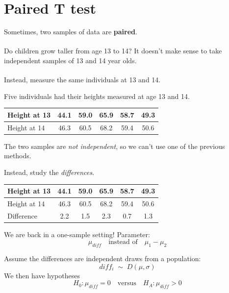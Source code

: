 \documentclass[xcolor={dvipsnames,svgnames},14pt]{beamer}
\begin{document}
\section{Paired T test}

\begin{frame}
Sometimes, two samples of data are \textbf{paired}. \\~\\

Do children grow taller from age 13 to 14?  It doesn't make sense to take independent samples of 13 and 14 year olds. \\~\\

Instead, measure the same individuals at 13 and 14.
\end{frame}

\begin{frame}
Five individuals had their heights measured at age 13 and 14.
\begin{center}
\begin{tabular}{|l||c|c|c|c|c|}
\hline
Height at 13 & 44.1 & 59.0 & 65.9 & 58.7 & 49.3 \\
\hline
Height at 14 & 46.3 & 60.5 & 68.2 & 59.4 & 50.6 \\
\hline
\end{tabular}
\end{center}
\vspace{5pt}
The two samples are \textit{not independent}, so we can't use one of the previous methods.
\end{frame}

\begin{frame}
Instead, study the \textit{differences}.
\begin{center}
\begin{tabular}{|l||c|c|c|c|c|}
\hline
Height at 13 & 44.1 & 59.0 & 65.9 & 58.7 & 49.3 \\
\hline
Height at 14 & 46.3 & 60.5 & 68.2 & 59.4 & 50.6 \\
\hline
\hline
Difference & 2.2 & 1.5 & 2.3 & 0.7 & 1.3 \\
\hline
\end{tabular}
\end{center}
\vspace{5pt}
We are back in a one-sample setting!  Parameter:
$$\mu_{diff} \quad \text{instead of}\quad \mu_1 - \mu_2$$
\end{frame}

\begin{frame}
Assume the differences are independent draws from a population:
$$diff_i \;\sim\; D(\mu, \sigma)$$
We then have hypotheses
$$H_0: \mu_{diff} = 0 \quad \text{versus} \quad H_A: \mu_{diff} > 0$$
\end{frame}
\end{document}
